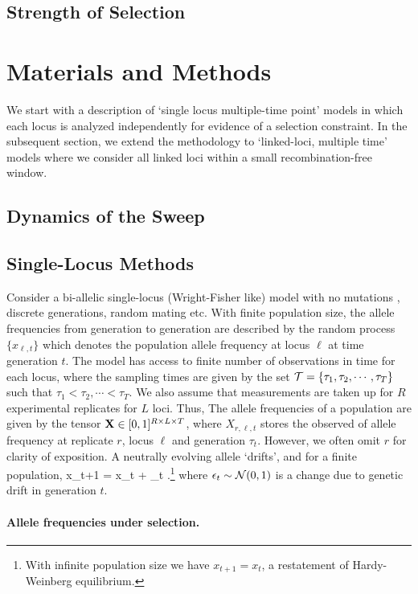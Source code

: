 \documentclass[11pt]{article}
\begin{document}
\subsection{Strength of  Selection}


\section{Materials and Methods}
We start with a description of `single locus multiple-time point'
models in which each locus is analyzed independently for evidence of a
selection constraint. In the subsequent section, we extend the
methodology to `linked-loci, multiple time' models where we consider
all linked loci within a small recombination-free window.

\subsection{Dynamics of the Sweep}

\subsection{Single-Locus Methods}
Consider a bi-allelic single-locus (Wright-Fisher like) model with no
mutations \cite{Ewens2012Mathematical}, discrete generations, random
 mating etc. With finite population size, the allele frequencies from
generation to generation are described by the random process
$\{x_{\ell,t}\}$ which denotes the population allele frequency at
locus $\ell$ at time generation $t$. The model has access to finite
number of observations in time for each locus, where the sampling
times are given by the set ${\cal T}=\{\tau_1,\tau_2,\cdots, \tau_T \}$
such that $\tau_1<\tau_2,\cdots<\tau_T$. We also assume that
measurements are taken up for $R$ experimental replicates for $L$
loci. Thus, The allele frequencies of a population are given by the
tensor ${\mathbf X} \in [0,1]^{R \times L \times T}$, where $X_{r,\ell,t}$
stores the observed of allele frequency at replicate $r$, locus $\ell$
and generation $\tau_t$. However, we often omit $r$ for clarity of
exposition. A neutrally evolving allele `drifts', and for a finite
population,
\beq x_{t+1} = x_t + \epsilon_t\; .\footnote{With infinite population size
	we have $x_{t+1} = x_t$, a restatement of Hardy-Weinberg
	equilibrium.}
\label{eq:drift}
\eeq where $\epsilon_t \sim {\cal N}(0,1)$ is a change due to genetic drift
in generation $t$.

\paragraph{Allele frequencies under selection.}
\end{document}
